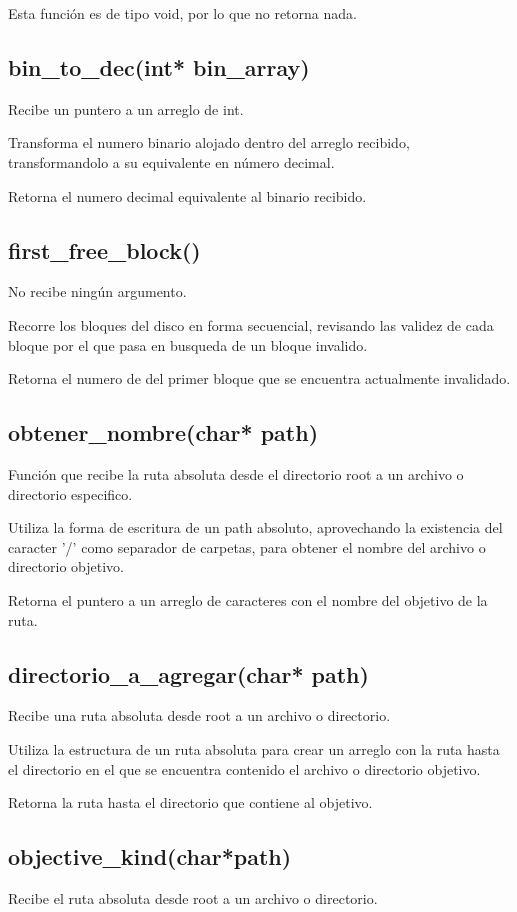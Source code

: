 \documentclass[12pt]{article}
\begin{document}
Esta función es de tipo void, por lo que no retorna nada.

\subsection{bin\_to\_dec(int* bin\_array)}
Recibe un puntero a un arreglo de int.

Transforma el numero binario alojado dentro del arreglo recibido, transformandolo a su equivalente en número decimal.

Retorna el numero decimal equivalente al binario recibido.

\subsection{first\_free\_block()}
No recibe ningún argumento.

Recorre los bloques del disco en forma secuencial, revisando las validez de cada bloque por el que pasa en busqueda de un bloque invalido.

Retorna el numero de del primer bloque que se encuentra actualmente invalidado.

\subsection{obtener\_nombre(char* path)}
Función que recibe la ruta absoluta desde el directorio root a un archivo o directorio especifico.

Utiliza la forma de escritura de un path absoluto, aprovechando la existencia del caracter '/' como separador de carpetas, para obtener el nombre del archivo o directorio objetivo.

Retorna el puntero a un arreglo de caracteres con el nombre del objetivo de la ruta.

\subsection{directorio\_a\_agregar(char* path)}
Recibe una ruta absoluta desde root a un archivo o directorio.

Utiliza la estructura de un ruta absoluta para crear un arreglo con la ruta hasta el directorio en el que se encuentra contenido el archivo o directorio objetivo.

Retorna la ruta hasta el directorio que contiene al objetivo.

\subsection{objective\_kind(char*path)}
Recibe el ruta absoluta desde root a un archivo o directorio.
\end{document}
